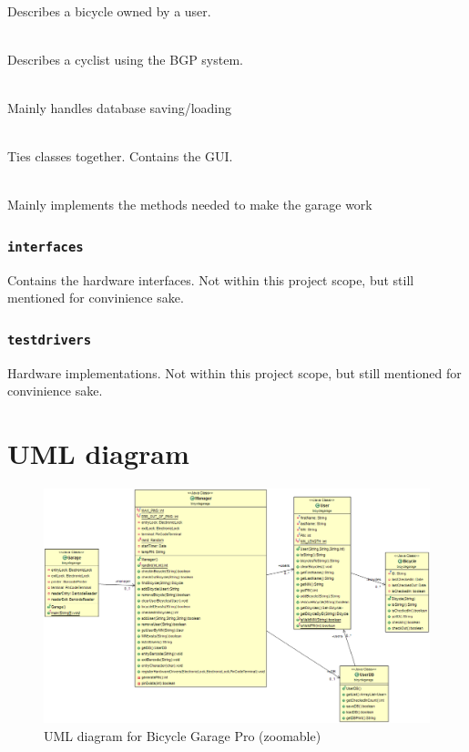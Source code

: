 \documentclass[12pt,titlepage]{article}
\begin{document}
\begin{description}[font=\normalfont]
	\item [\texttt{Bicycle}]	\hfill \\
		Describes a bicycle owned by a user.

	\item [\texttt{User}]		\hfill \\
		Describes a cyclist using the BGP system.

	\item [\texttt{UserDB}]		\hfill \\
		Mainly handles database saving/loading

	\item [\texttt{Garage}]		\hfill \\
		Ties classes together. Contains the GUI.

	\item [\texttt{Manager}]	\hfill \\
		Mainly implements the methods needed to make the garage work

\end{description}


\subsubsection{\texttt{interfaces}}
Contains the hardware interfaces. Not within this project scope, but still mentioned for convinience sake.
\subsubsection{\texttt{testdrivers}}
Hardware implementations. Not within this project scope, but still mentioned for convinience sake.



\newpage
\appendix

\section{UML diagram}
\label{app:example-appendix-section}
\begin{figure}[!h]
\centering
\includegraphics[width=\textwidth]{BGP.png}
\caption{UML diagram for Bicycle Garage Pro (zoomable)}
\label{fig:lol}
\end{figure}
\end{document}
